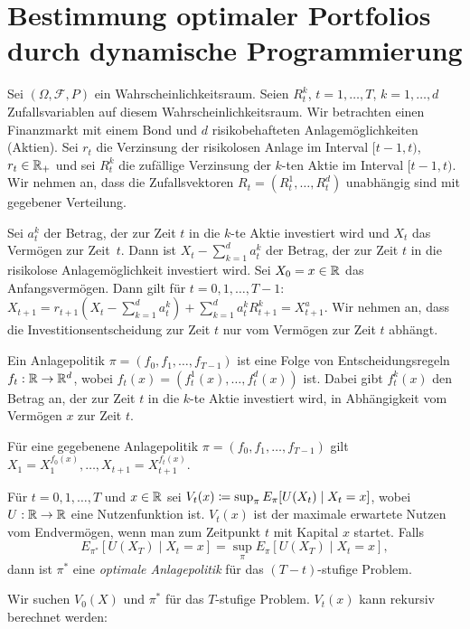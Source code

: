 \documentclass[a4paper,twoside,DIV15,BCOR12mm]{scrbook}
\newcommand{\cF}{\mathcal F}
\begin{document}
\section{Bestimmung optimaler Portfolios durch dynamische Programmierung}

Sei $(\Omega,\cF,P)$ ein Wahrscheinlichkeitsraum. Seien $R_t^k$, $t=1,\ldots, T$, $k=1,\ldots,d$ Zufallsvariablen auf diesem Wahrscheinlichkeitsraum. Wir betrachten einen Finanzmarkt mit einem Bond und $d$ risikobehafteten Anlagemöglichkeiten (Aktien). Sei $r_t$ die Verzinsung der risikolosen Anlage im Interval $[t-1,t)$, $r_t\in \mathbb{R}_+$ und sei $R_t^k$ die zufällige Verzinsung der $k$-ten Aktie im Interval $[t-1,t)$. Wir nehmen an, dass die Zufallsvektoren $R_t=(R_t^1,\ldots,R_t^d)$ unabhängig sind mit gegebener Verteilung.

Sei $a_t^k$ der Betrag, der zur Zeit $t$ in die $k$-te Aktie investiert wird und $X_t$ das Vermögen zur Zeit~$t$. Dann ist $X_t - \sum_{k=1}^d a_t^k$ der Betrag, der zur Zeit $t$ in die risikolose Anlagemöglichkeit investiert wird. Sei $X_0=x \in \mathbb{R}$ das Anfangsvermögen. Dann gilt für $t=0,1,\ldots, T-1$: $X_{t+1} = r_{t+1}(X_t - \sum_{k=1}^d a_t^k) + \sum_{k=1}^d a_t^k R_{t+1}^k = X_{t+1}^a$.
Wir nehmen an, dass die Investitionsentscheidung zur Zeit $t$ nur vom Vermögen zur Zeit $t$ abhängt.

\begin{definition}
Ein Anlagepolitik $\pi = (f_0,f_1,\ldots,f_{T-1})$ ist eine Folge von Entscheidungsregeln $f_t:\mathbb{R}\to\mathbb{R}^d$, wobei $f_t(x) =(f_t^1(x),\ldots,f_t^d(x))$ ist. Dabei gibt $f_t^k(x)$ den Betrag an, der zur Zeit $t$ in die $k$-te Aktie investiert wird, in Abhängigkeit vom Vermögen $x$ zur Zeit $t$.

Für eine gegebenene Anlagepolitik $\pi=(f_0,f_1,\ldots,f_{T-1})$ gilt $X_1 = X_1^{f_0(x)},\ldots, X_{t+1} =X_{t+1}^{f_t(x)}$.
\end{definition}

\begin{definition}
Für $t=0,1,\ldots,T$ und $x\in\mathbb{R}$ sei $V_t(x) \da \sup_\pi E_\pi[U(X_t)\mid X_t=x]$, wobei $U:\mathbb{R}\to\mathbb{R}$ eine Nutzenfunktion ist. $V_t(x)$ ist der maximale erwartete Nutzen vom Endvermögen, wenn man zum Zeitpunkt $t$ mit Kapital $x$ startet. Falls
\[
E_{\pi^*}[U(X_T)\mid X_t=x] 
= \sup_{\pi} E_\pi[U(X_T)\mid X_t=x],
\]
dann ist $\pi^*$ eine \emph{optimale Anlagepolitik} für das $(T-t)$-stufige Problem.
\end{definition}

Wir suchen $V_0(X)$ und $\pi^*$ für das $T$-stufige Problem.
$V_t(x)$ kann rekursiv berechnet werden:
\end{document}
